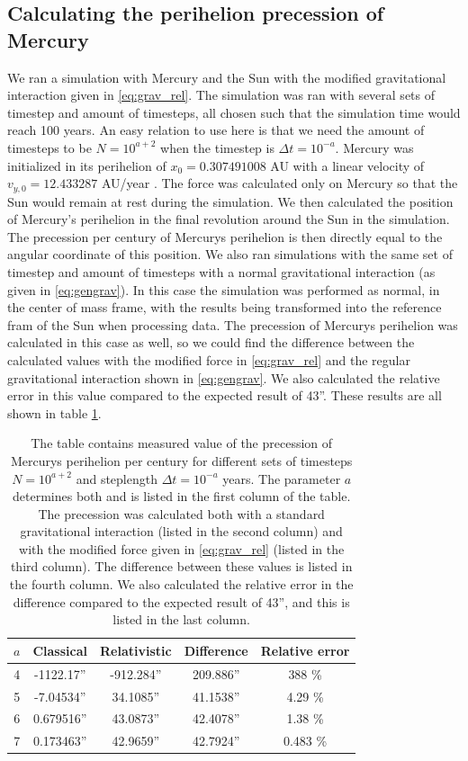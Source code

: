 \documentclass[reprint,english,notitlepage]{revtex4-1}  %
\begin{document}
\subsection{Calculating the perihelion precession of Mercury} \label{sec:IV:g}

We ran a simulation with Mercury and the Sun with the modified gravitational interaction given in \eqref{eq:grav_rel}. The simulation was ran with several sets of timestep and amount of timesteps, all chosen such that the simulation time would reach 100 years. An easy relation to use here is that we need the amount of timesteps to be $N = 10^{a+2}$ when the timestep is $\Delta t =  10^{-a}$. Mercury was initialized in its perihelion of \(x_{0}=0.307491008\) AU with a linear velocity of \(v_{y,0} = 12.433287\) AU/year \citep{NASASolarInit}. The force was calculated only on Mercury so that the Sun would remain at rest during the simulation. We then calculated the position of Mercury's perihelion in the final revolution around the Sun in the simulation. The precession per century of Mercurys perihelion is then directly equal to the angular coordinate of this position. We also ran simulations with the same set of timestep and amount of timesteps with a normal gravitational interaction (as given in \eqref{eq:gengrav}). In this case the simulation was performed as normal, in the center of mass frame, with the results being transformed into the reference fram of the Sun when processing data. The precession of Mercurys perihelion was calculated in this case as well, so we could find the difference between the calculated values with the modified force in \eqref{eq:grav_rel} and the regular gravitational interaction shown in \eqref{eq:gengrav}. We also calculated the relative error in this value compared to the expected result of 43''. These results are all shown in table \ref{table:precession}.


\begin{table}[H]
\caption{The table contains measured value of the precession of Mercurys perihelion per century for different sets of timesteps $N = 10^{a+2}$ and steplength $\Delta t = 10^{-a}$ years. The parameter $a$ determines both and is listed in the first column of the table. The precession was calculated both with a standard gravitational interaction (listed in the second column) and with the modified force given in \eqref{eq:grav_rel} (listed in the third column). The difference between these values is listed in the fourth column. We also calculated the relative error in the difference compared to the expected result of 43'', and this is listed in the last column. }
\begin{tabular}{|c|c|c|c|c|}
\hline
$a$ & Classical & Relativistic & Difference & Relative error \\
\hline
4 & -1122.17'' & -912.284'' & 209.886'' & 388 \% \\
5 & -7.04534'' & 34.1085'' & 41.1538'' & 4.29 \% \\
6 & 0.679516'' & 43.0873'' & 42.4078'' & 1.38 \% \\
7 & 0.173463'' & 42.9659'' & 42.7924'' & 0.483 \% \\
\hline
\end{tabular}
\label{table:precession}
\end{table}
\end{document}
